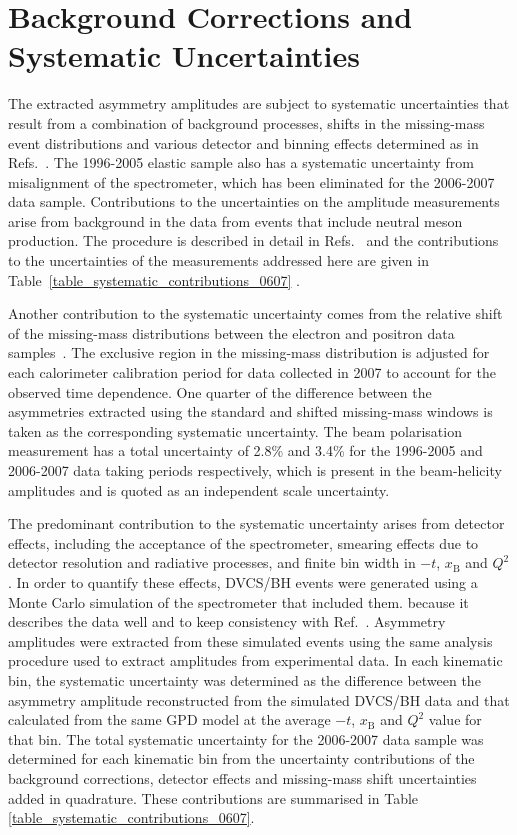 \section{Background Corrections and Systematic Uncertainties}
The extracted asymmetry amplitudes are subject to systematic uncertainties that
result from a combination of background processes, 
shifts in the missing-mass event distributions and various detector and binning
effects determined as in Refs.~\cite{Air08,Air09}. The
1996-2005 elastic sample also has a systematic uncertainty from misalignment of the spectrometer, which has been eliminated for the 2006-2007 data sample. Contributions to the uncertainties on the amplitude measurements arise from background in the data from events that include neutral meson production. The procedure is described in detail in Refs.~\cite{Air08,Air09} and the contributions to the uncertainties of the measurements addressed here are given in Table~\ref{table_systematic_contributions_0607} . 

Another contribution to the systematic uncertainty comes from the relative shift of the
missing-mass distributions between the electron and positron data
samples~\cite{Zei09,Bur10}. The exclusive region in the missing-mass
distribution is adjusted for each calorimeter calibration period for data
collected in 2007 to account for the observed time dependence. One
quarter of the difference between the asymmetries extracted using the standard
and shifted missing-mass windows is taken as the corresponding systematic
uncertainty. The beam polarisation measurement has a total uncertainty of 2.8\% and 3.4\% for the 1996-2005 and 2006-2007 data taking periods respectively,
which is present in the beam-helicity amplitudes and is quoted as an
independent scale uncertainty.

The predominant contribution to the systematic uncertainty arises from detector
effects, including the acceptance of the spectrometer, smearing effects due to detector resolution and radiative processes, and
finite bin width in $-t$, $x_{\textrm{B}}$ and $Q^{2}$. In order to quantify
these effects, DVCS/BH events were generated using a Monte Carlo simulation of
the spectrometer that included them.  because it describes the data well and to keep consistency with Ref.~\cite{Air09}. Asymmetry amplitudes were extracted from these simulated events using the same analysis
procedure used to extract amplitudes from experimental data.  In each kinematic
bin, the systematic uncertainty was determined as the difference between the
asymmetry amplitude reconstructed from the simulated DVCS/BH data and that
calculated from the same GPD model at the average $-t$, $x_{\textrm{B}}$ and
$Q^{2}$ value for that bin.
The total systematic uncertainty for the 2006-2007 data sample was
determined for each kinematic bin from the uncertainty contributions of the
background corrections, detector effects and missing-mass shift
uncertainties added in quadrature. These contributions are summarised in Table
\ref{table_systematic_contributions_0607}.

